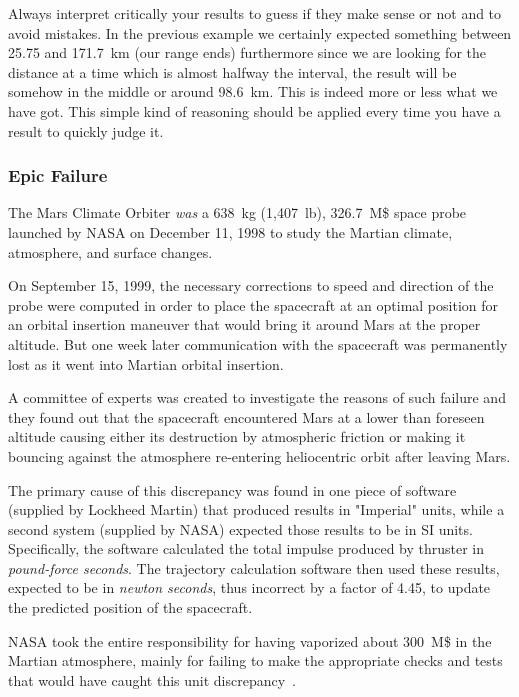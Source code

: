 Always interpret critically your results to guess if they make sense or not and to avoid mistakes. In the previous example we certainly expected something between 25.75 and 171.7~km (our range ends) furthermore since we are looking for the distance at a time which is almost halfway the interval, the result will be somehow in the middle or around 98.6~km. This is indeed more or less what we have got.
This simple kind of reasoning should be applied every time you have a result to quickly judge it.

\begin{curiosity}
\subsubsection{Epic Failure}
The Mars Climate Orbiter \emph{was} a 638~kg (1,407~lb), 326.7~M\$ space probe launched by NASA on December 11, 1998 to study the Martian climate, atmosphere, and surface changes. 

On September 15, 1999, the necessary corrections to speed and direction of the probe were computed in order to place the spacecraft at an optimal position for an orbital insertion maneuver that would bring it around Mars at the proper altitude. 
But one week later communication with the spacecraft was permanently lost as it went into Martian orbital insertion. 

A committee of experts was created to investigate the reasons of 
such failure and they found out that the spacecraft encountered Mars at a lower than foreseen altitude causing either its destruction by atmospheric friction or making it bouncing against the atmosphere re-entering heliocentric orbit after leaving Mars.

The primary cause of this discrepancy was found in one piece of software (supplied by Lockheed Martin) that produced results in "Imperial" units,  while a second system (supplied by NASA) expected those results to be in SI units. Specifically, the software calculated the total impulse produced by thruster in \emph{pound-force seconds}. The trajectory calculation software then used these results, expected to be in \emph{newton seconds}, thus incorrect by a factor of 4.45, to update the predicted position of the spacecraft.
	
NASA took the entire responsibility for having vaporized about 300~M\$ in the Martian atmosphere, mainly for failing to make the appropriate checks and tests that would have caught this unit discrepancy~\cite{bib:mars}.	
\end{curiosity}


